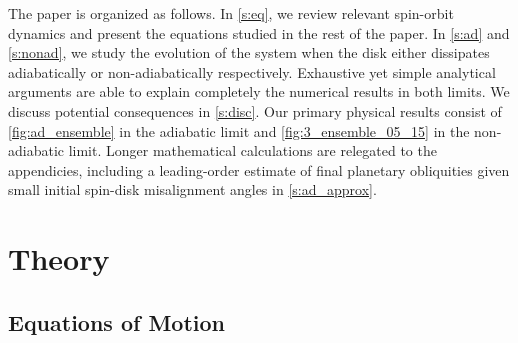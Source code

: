 \documentclass[
        fleqn,
        usenatbib,
        referee,
    ]{mnras}
\begin{document}
The paper is organized as follows. In \autoref{s:eq}, we review relevant
spin-orbit dynamics and present the equations studied in the rest of the paper.
In \autoref{s:ad} and \autoref{s:nonad}, we study the evolution of the system
when the disk either dissipates adiabatically or non-adiabatically respectively.
Exhaustive yet simple analytical arguments are able to explain completely the
numerical results in both limits. We discuss potential consequences in
\autoref{s:disc}. Our primary physical results consist of
\autoref{fig:ad_ensemble} in the adiabatic limit and
\autoref{fig:3_ensemble_05_15} in the non-adiabatic limit. Longer mathematical
calculations are relegated to the appendicies, including a leading-order
estimate of final planetary obliquities given small initial spin-disk
misalignment angles in \autoref{s:ad_approx}.

\section{Theory}\label{s:eq}

\subsection{Equations of Motion}
\end{document}
